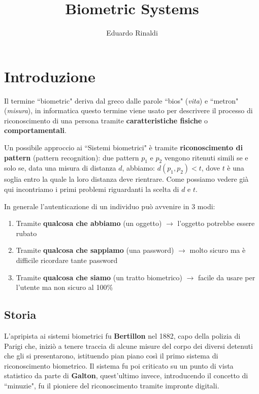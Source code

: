 \documentclass{article}
\title{Biometric Systems}
\author{Eduardo Rinaldi}
\date{}
\begin{document}
\maketitle

\tableofcontents
\newpage

\section{Introduzione}
Il termine ``biometric" deriva dal greco dalle parole ``bios" (\textit{vita}) e ``metron" (\textit{misura}), in informatica questo termine viene usato per descrivere il processo di riconoscimento di una persona tramite \textbf{caratteristiche fisiche} o \textbf{comportamentali}.

\bigskip
Un possibile approccio ai ``Sistemi biometrici" è tramite \textbf{riconoscimento di pattern} (pattern recognition): due pattern $p_1$ e $p_2$ vengono ritenuti simili se e solo se, data una misura di distanza $d$, abbiamo: $d(p_1, p_2) < t$, dove $t$ è una soglia entro la quale la loro distanza deve rientrare. Come possiamo vedere già qui incontriamo i primi problemi riguardanti la scelta di $d$ e $t$.

\bigskip
In generale l'autenticazione di un individuo può avvenire in 3 modi:
\begin{enumerate}
    \item Tramite \textbf{qualcosa che abbiamo} (un oggetto) $\rightarrow$ l'oggetto potrebbe essere rubato
    \item Tramite \textbf{qualcosa che sappiamo} (una password) $\rightarrow$ molto sicuro ma è difficile ricordare tante password
    \item Tramite \textbf{qualcosa che siamo} (un tratto biometrico) $\rightarrow$ facile da usare per l'utente ma non sicuro al 100\%
\end{enumerate}

\subsection{Storia}
L'apripista ai sistemi biometrici fu \textbf{Bertillon} nel 1882, capo della polizia di Parigi che, iniziò a tenere traccia di alcune misure del corpo dei diversi detenuti che gli si presentarono, istituendo pian piano così il primo sistema di riconoscimento biometrico. Il sistema fu poi criticato su un punto di vista statistico da parte di \textbf{Galton}, quest'ultimo invece, introducendo il concetto di ``minuzie", fu il pioniere del riconoscimento tramite impronte digitali.
\end{document}

